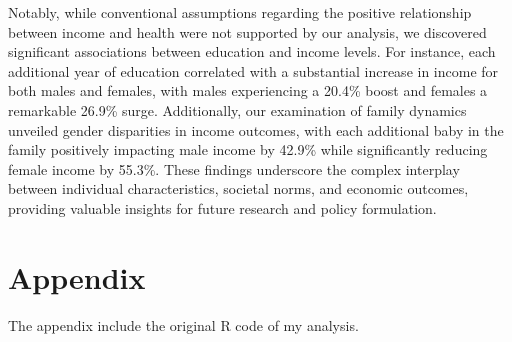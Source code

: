 \documentclass{article}[13pt]
\begin{document}
\qquad Notably, while conventional assumptions regarding the positive relationship between income and health were 
not supported by our analysis, we discovered significant associations between education and income levels. For 
instance, each additional year of education correlated with a substantial increase in income for both males and females, 
with males experiencing a 20.4\% boost and females a remarkable 26.9\% surge. Additionally, our examination of family dynamics 
unveiled gender disparities in income outcomes, with each additional baby in the family positively impacting male income by 42.9\% 
while significantly reducing female income by 55.3\%. These findings underscore the complex interplay between individual characteristics, 
societal norms, and economic outcomes, providing valuable insights for future research and policy formulation.
\newpage

\section{Appendix}

The appendix include the original R code of my analysis.
\end{document}
